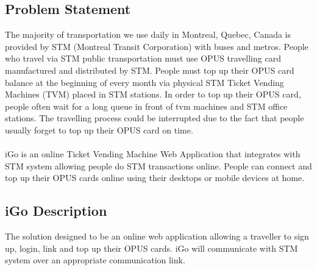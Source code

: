 \documentclass[11pt, english]{article}
\begin{document}
\subsection{Problem Statement}
The majority of  transportation  we use daily in Montreal, Quebec, Canada is provided by STM (Montreal Transit Corporation) with buses and metros. People who travel via STM public transportation must use OPUS travelling card manufactured and distributed by STM. People must top up their OPUS card balance at the beginning of every month via physical STM Ticket Vending Machines (TVM) placed in STM stations. In order to top up their OPUS card, people often wait for a long queue in front of \gls{tvm} machines and STM office stations. The travelling process could be interrupted due to the fact that people usually forget to top up their OPUS card on time. \\ \\
iGo is an online Ticket Vending Machine Web Application that integrates with STM system allowing people do STM transactions online. People can connect and top up their OPUS cards online using their desktops or mobile devices at home. 

\subsection{iGo Description}
The solution designed to be an online web application allowing a \gls{traveller} to sign up, login, link and top up their OPUS cards. iGo will communicate with STM system over an appropriate communication link. \\

\end{document}
